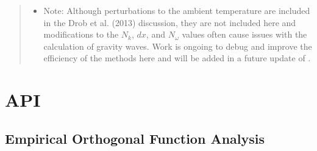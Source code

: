 \documentclass[letterpaper,10pt,english]{sphinxmanual}
\let\sphinxpxdimen\pdfpxdimen\else\newdimen\sphinxpxdimen
\begin{document}
\begin{itemize}
\begin{quote}
\begin{itemize}
\end{itemize}

\begin{figure}[htbp]
\centering

\noindent\sphinxincludegraphics[width=300\sphinxpxdimen]{{gw_example}.png}
\end{figure}
\begin{itemize}
\item {} 
\sphinxAtStartPar
Note: Although perturbations to the ambient temperature are included in the Drob et al. (2013) discussion, they are not included here and modifications to the \(N_k\), \(dx\), and \(N_\omega\) values often cause issues with the calculation of gravity waves.  Work is ongoing to debug and improve the efficiency of the methods here and will be added in a future update of .

\end{itemize}
\end{quote}

\end{itemize}


\section{API}
\label{\detokenize{stochprop:api}}\label{\detokenize{stochprop:id1}}\label{\detokenize{stochprop::doc}}

\subsection{Empirical Orthogonal Function Analysis}
\label{\detokenize{stochprop.eofs:module-stochprop.eofs}}\label{\detokenize{stochprop.eofs:empirical-orthogonal-function-analysis}}\label{\detokenize{stochprop.eofs::doc}}
\end{document}
